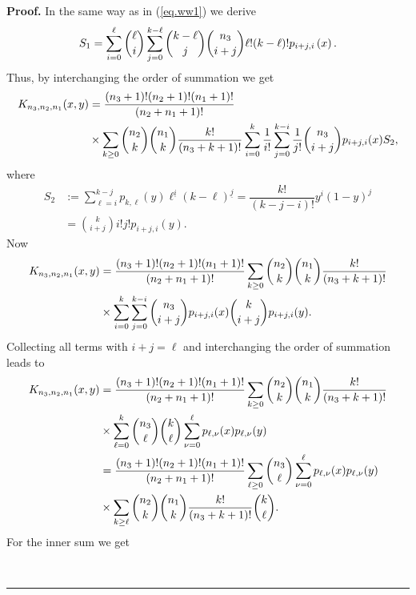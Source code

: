 \documentclass[10pt,a4paper]{amsart}
\newenvironment{proof}[1][Proof]{\noindent\textbf{#1.} }{\ \rule{0.5em}{0.5em}}
\begin{document}
\begin{proof}
In the same way as in (\ref{eq.ww1}) we derive 
\begin{equation*}
S_{1}=\displaystyle \sum_{i=0}^{\ell }{\binom{\ell }{i}}\sum_{j=0}^{k-\ell }{%
\binom{k-\ell }{j}}{\binom{n_{3}}{i+j}}\ell !(k-\ell )!p_{i+j,i}\left(
x\right) .
\end{equation*}%
Thus, by interchanging the order of summation we get 
\begin{align*}
K_{n_{3},n_{2},n_{1}}(x,y)& =\dfrac{(n_{3}+1)!(n_{2}+1)!(n_{1}+1)!}{%
(n_{2}+n_{1}+1)!} \\
& \times \sum_{k\geq 0}{\binom{n_{2}}{k}}{\binom{n_{1}}{k}}\dfrac{k!}{%
(n_{3}+k+1)!}\sum_{i=0}^{k}\dfrac{1}{i!}\sum_{j=0}^{k-i}\dfrac{1}{j!}{\binom{%
n_{3}}{i+j}}p_{i+j,i}(x)S_{2},
\end{align*}%
where 
\begin{align*}
S_{2}& :=\displaystyle \sum_{\ell =i}^{k-j}p_{k,\ell }(y)\ell ^{\underline{i}%
}(k-\ell )^{\underline{j}}=\dfrac{k!}{(k-j-i)!}y^{i}(1-y)^{j} \\
& ={\binom{k}{i+j}}i!j!p_{i+j,i}(y).
\end{align*}%
Now 
\begin{align*}
K_{n_{3},n_{2},n_{1}}(x,y)& =\dfrac{(n_{3}+1)!(n_{2}+1)!(n_{1}+1)!}{%
(n_{2}+n_{1}+1)!}\sum_{k\geq 0}{\binom{n_{2}}{k}}{\binom{n_{1}}{k}}\dfrac{k!%
}{(n_{3}+k+1)!} \\
& \times \sum_{i=0}^{k}\sum_{j=0}^{k-i}{\binom{n_{3}}{i+j}}p_{i+j,i}(x){%
\binom{k}{i+j}}p_{i+j,i}(y).
\end{align*}%
Collecting all terms with $i+j=\ell $ and interchanging the order of
summation leads to 
\begin{align*}
K_{n_{3},n_{2},n_{1}}(x,y)& =\dfrac{(n_{3}+1)!(n_{2}+1)!(n_{1}+1)!}{%
(n_{2}+n_{1}+1)!}\sum_{k\geq 0}{\binom{n_{2}}{k}}{\binom{n_{1}}{k}}\dfrac{k!%
}{(n_{3}+k+1)!} \\
& \times \sum_{\ell =0}^{k}{\binom{n_{3}}{\ell }}{\binom{k}{\ell }}\sum_{\nu
=0}^{\ell }p_{\ell ,\nu }(x)p_{\ell ,\nu }(y) \\
& =\dfrac{(n_{3}+1)!(n_{2}+1)!(n_{1}+1)!}{(n_{2}+n_{1}+1)!}\sum_{\ell \geq 0}%
{\binom{n_{3}}{\ell }}\sum_{\nu =0}^{\ell }p_{\ell ,\nu }(x)p_{\ell ,\nu }(y)
\\
& \times \sum_{k\geq \ell }{\binom{n_{2}}{k}}{\binom{n_{1}}{k}}\dfrac{k!}{%
(n_{3}+k+1)!}{\binom{k}{\ell }}.
\end{align*}%
For the inner sum we get


\end{proof}
\end{document}
